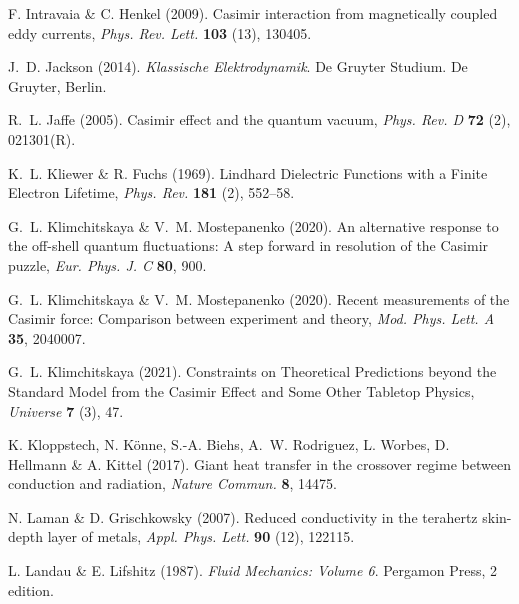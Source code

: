 \documentclass[11pt, oneside]{article}   	%
\begin{document}
\begin{thebibliography}{58}
F. Intravaia \& C. Henkel (2009).
\newblock Casimir interaction from magnetically coupled eddy currents,
  \emph{Phys. Rev. Lett.} {\bf 103} (13), 130405.

J.~D. Jackson (2014).
\newblock \emph{Klassische Elektrodynamik}.
\newblock De Gruyter Studium. De Gruyter, Berlin.

R.~L. Jaffe (2005).
\newblock Casimir effect and the quantum vacuum, \emph{Phys. Rev. D} {\bf 72}
  (2), 021301(R).

K.~L. Kliewer \& R. Fuchs (1969).
\newblock Lindhard Dielectric Functions with a Finite Electron Lifetime,
  \emph{Phys. Rev.} {\bf 181} (2), 552--58.

G.~L. Klimchitskaya \& V.~M. Mostepanenko (2020{}).
\newblock An alternative response to the off-shell quantum fluctuations: A step
  forward in resolution of the Casimir puzzle, \emph{Eur. Phys. J. C} {\bf 80},
  900.

G.~L. Klimchitskaya \& V.~M. Mostepanenko (2020{}).
\newblock Recent measurements of the Casimir force: Comparison between
  experiment and theory, \emph{Mod. Phys. Lett. A} {\bf 35}, 2040007.

G.~L. Klimchitskaya (2021).
\newblock Constraints on Theoretical Predictions beyond the Standard Model from
  the Casimir Effect and Some Other Tabletop Physics, \emph{Universe} {\bf 7}
  (3), 47.

K. Kloppstech, N. K{\"o}nne, S.-A. Biehs, A.~W. Rodriguez, L. Worbes, D.
  Hellmann \& A. Kittel (2017).
\newblock Giant heat transfer in the crossover regime between conduction and
  radiation, \emph{Nature Commun.} {\bf 8}, 14475.

N. Laman \& D. Grischkowsky (2007).
\newblock Reduced conductivity in the terahertz skin-depth layer of metals,
  \emph{Appl. Phys. Lett.} {\bf 90} (12), 122115.

L. Landau \& E. Lifshitz (1987).
\newblock \emph{Fluid Mechanics: Volume 6}.
\newblock Pergamon Press, 2 edition.


\end{thebibliography}
\end{document}

